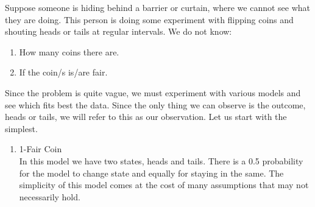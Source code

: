 \begin{example}
    \label{motivhmmcoin}
    Suppose someone is hiding behind a barrier or curtain, where we cannot see what they are doing. This person is doing some experiment with flipping coins and shouting heads or tails at regular intervals. We do not know:
    \begin{enumerate}[i]
        \item How many coins there are.
        \item If the coin/s is/are fair.
    \end{enumerate}
    Since the problem is quite vague, we must experiment with various models and see which fits best the data. Since the only thing we can observe is the outcome, heads or tails, we will refer to this as our observation. Let us start with the simplest. 
    \begin{enumerate}
        \item 1-Fair Coin \\ In this model we have two states, heads and tails. There is a 0.5 probability for the model to change state and equally for staying in the same. The simplicity of this model comes at the cost of many assumptions that may not necessarily hold.
        \begin{center}
            

\end{center}
\end{enumerate}
\end{example}
